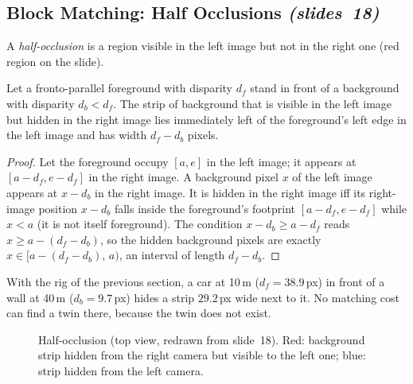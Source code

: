 \documentclass[11pt,a4paper]{article}
\newcommand{\slr}[1]{\texorpdfstring{\emph{(slides~#1)}}{(slides #1)}}
\theoremstyle{definition}
\begin{document}
\subsection{Block Matching: Half Occlusions \slr{18}}
A \emph{half-occlusion} is a region visible in the left image but not in the right one (red region on the slide).
\begin{Proposition}
Let a fronto-parallel foreground with disparity $d_f$ stand in front of a background with disparity $d_b<d_f$. The strip of background that is visible in the left image but hidden in the right image lies immediately left of the foreground's left edge in the left image and has width $d_f-d_b$ pixels.
\end{Proposition}
\begin{proof}
Let the foreground occupy $[a,e]$ in the left image; it appears at $[a-d_f,e-d_f]$ in the right image. A background pixel $x$ of the left image appears at $x-d_b$ in the right image. It is hidden in the right image iff its right-image position $x-d_b$ falls inside the foreground's footprint $[a-d_f,e-d_f]$ while $x<a$ (it is not itself foreground). The condition $x-d_b\ge a-d_f$ reads $x\ge a-(d_f-d_b)$, so the hidden background pixels are exactly $x\in[a-(d_f-d_b),\,a)$, an interval of length $d_f-d_b$.
\end{proof}
\begin{Example}
With the rig of the previous section, a car at 10\,m ($d_f=38.9$\,px) in front of a wall at 40\,m ($d_b=9.7$\,px) hides a strip $29.2$\,px wide next to it. No matching cost can find a twin there, because the twin does not exist.
\end{Example}
\begin{figure}[H]\centering
{}
\caption{Half-occlusion (top view, redrawn from slide~18). Red: background strip hidden from the right camera but visible to the left one; blue: strip hidden from the left camera.}
\end{figure}
\end{document}
